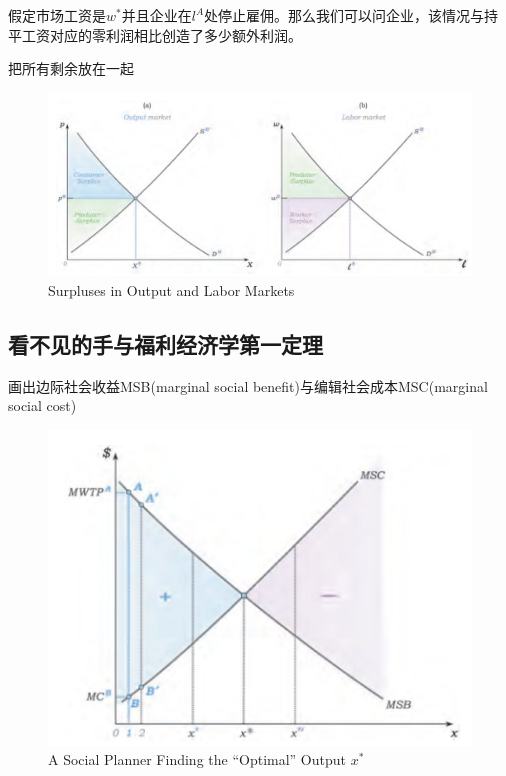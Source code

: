 \documentclass{article}
\begin{document}
假定市场工资是$ w^* $并且企业在$ l^A $处停止雇佣。那么我们可以问企业，该情况与持平工资对应的零利润相比创造了多少额外利润。

\hspace*{\fill}

把所有剩余放在一起

\begin{figure}[H] %
	\centering %
	\includegraphics[width=1\textwidth]{15_4} %
	\caption{Surpluses in Output and Labor Markets} %
	\label{Fig.main5} %
\end{figure}

\subsection{看不见的手与福利经济学第一定理}

画出边际社会收益MSB(marginal social benefit)与编辑社会成本MSC(marginal social cost)

\begin{figure}[H] %
	\centering %
	\includegraphics[width=1\textwidth]{15_5} %
	\caption{A Social Planner Finding the “Optimal” Output $ x^* $} %
	\label{Fig.main6} %
\end{figure}
\end{document}
